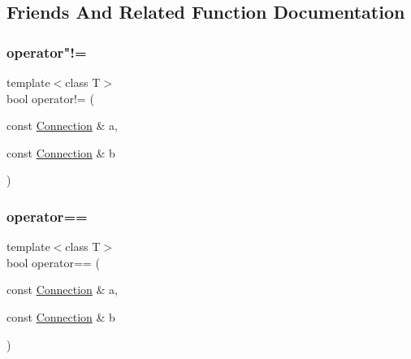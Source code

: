 \subsection{Friends And Related Function Documentation}
\mbox{\label{struct_frame_lib___object_1_1_connection_acedc598366e9ba4c003fb529cecf84ad}} 
\subsubsection{\texorpdfstring{operator"!=}{operator!=}}
{\footnotesize\ttfamily template$<$class T$>$ \\
bool operator!= (\begin{DoxyParamCaption}\item[{const \hyperlink{struct_frame_lib___object_1_1_connection}{Connection} \&}]{a,  }\item[{const \hyperlink{struct_frame_lib___object_1_1_connection}{Connection} \&}]{b }\end{DoxyParamCaption})\hspace{0.3cm}{\ttfamily [friend]}}

\mbox{\label{struct_frame_lib___object_1_1_connection_af5196f28c688a02175f42abc6209c254}} 
\subsubsection{\texorpdfstring{operator==}{operator==}}
{\footnotesize\ttfamily template$<$class T$>$ \\
bool operator== (\begin{DoxyParamCaption}\item[{const \hyperlink{struct_frame_lib___object_1_1_connection}{Connection} \&}]{a,  }\item[{const \hyperlink{struct_frame_lib___object_1_1_connection}{Connection} \&}]{b }\end{DoxyParamCaption})\hspace{0.3cm}{\ttfamily [friend]}}



